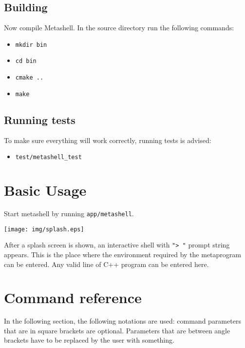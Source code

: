 \subsection{Building}

Now compile Metashell. In the source directory run the following commands:

\begin{itemize}
    \item \lstinline$mkdir bin$
    \item \lstinline$cd bin$
    \item \lstinline$cmake ..$
    \item \lstinline$make$
\end{itemize}

\subsection{Running tests}

To make sure everything will work correctly, running tests is advised:

\begin{itemize}
    \item \lstinline$test/metashell_test$
\end{itemize}

\section{Basic Usage}

Start metashell by running \lstinline$app/metashell$.

\texttt{[image: img/splash.eps]}

After a splash screen is shown, an interactive shell with \lstinline$"> "$
prompt string appears. This is the place where the environment required by the
metaprogram can be entered. Any valid line of C++ program can be entered here.



\section{Command reference}

In the following section, the following notations are used: command parameters
that are in square brackets are optional. Parameters that are between angle
brackets have to be replaced by the user with something.



